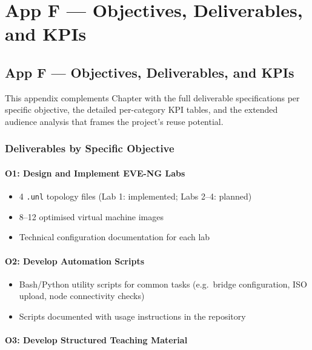 \chapter{App F --- Objectives, Deliverables, and KPIs}

\section{App F --- Objectives, Deliverables, and KPIs}

This appendix complements Chapter with the full deliverable specifications per specific objective, the detailed per-category KPI tables, and the extended audience analysis that frames the project's reuse potential.

\subsection{Deliverables by Specific Objective}

\subsubsection{O1: Design and Implement EVE-NG Labs}

\begin{itemize}
\tightlist
\item
  4 \texttt{.unl} topology files (Lab 1: implemented; Labs 2--4: planned)
\item
  8--12 optimised virtual machine images
\item
  Technical configuration documentation for each lab
\end{itemize}

\subsubsection{O2: Develop Automation Scripts}

\begin{itemize}
\tightlist
\item
  Bash/Python utility scripts for common tasks (e.g.~bridge configuration, ISO upload, node connectivity checks)
\item
  Scripts documented with usage instructions in the repository
\end{itemize}

\subsubsection{O3: Develop Structured Teaching Material}

